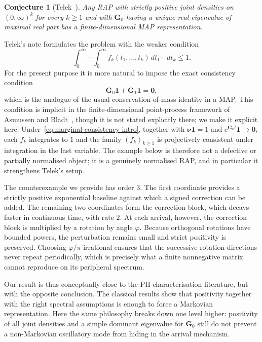 \documentclass[11pt]{article}
\newtheorem{conjecture}[theorem]{Conjecture}
\theoremstyle{definition}
\theoremstyle{remark}
\newcommand{\e}{\mathrm{e}}
\newcommand{\bzero}{\bm{0}}
\begin{document}
\begin{conjecture}[Telek~\cite{Telek2022}]\label{conj:telek}
Any RAP with strictly positive joint densities on $(0,\infty)^k$ for every $k\ge 1$ and with $\bm{G}_0$ having a unique real eigenvalue of maximal real part has a finite-dimensional MAP representation.
\end{conjecture}

Telek's note formulates the problem with the weaker condition
\[
\int_0^\infty\cdots \int_0^\infty f_k(t_1,\dots,t_k)
\,dt_1\cdots \,dt_k\le 1.
\]
For the present purpose it is more natural to impose the exact consistency condition
\begin{equation}\label{eq:marginal-consistency-intro}
\bm{G}_0\bm{1} + \bm{G}_1\bm{1} = \bzero,
\end{equation}
which is the analogue of the usual conservation-of-mass identity in a MAP. This condition is implicit in the finite-dimensional point-process framework of Asmussen and Bladt~\cite{AsmussenBladt1999}, though it is not stated explicitly there; we make it explicit here. Under~\eqref{eq:marginal-consistency-intro}, together with $\bm{\nu}\bm{1}=1$ and $\e^{\bm{G}_0t}\bm{1}\to\bzero$, each $f_k$ integrates to $1$ and the family $(f_k)_{k\ge 1}$ is projectively consistent under integration in the last variable. The example below is therefore not a defective or partially normalised object; it is a genuinely normalised RAP, and in particular it strengthens Telek's setup.

The counterexample we provide has order $3$. The first coordinate provides a strictly positive exponential baseline against which a signed correction can be added. The remaining two coordinates form the correction block, which decays faster in continuous time, with rate $2$. At each arrival, however, the correction block is multiplied by a rotation by angle $\varphi$. Because orthogonal rotations have bounded powers, the perturbation remains small and strict positivity is preserved. Choosing $\varphi/\pi$ irrational ensures that the successive rotation directions never repeat periodically, which is precisely what a finite nonnegative matrix cannot reproduce on its peripheral spectrum.

Our result is thus conceptually close to the PH-characterisation literature, but with the opposite conclusion. The classical results show that positivity together with the right spectral assumptions is enough to force a Markovian representation. Here the same philosophy breaks down one level higher: positivity of all joint densities and a simple dominant eigenvalue for $\bm{G}_0$ still do not prevent a non-Markovian oscillatory mode from hiding in the arrival mechanism.
\end{document}
